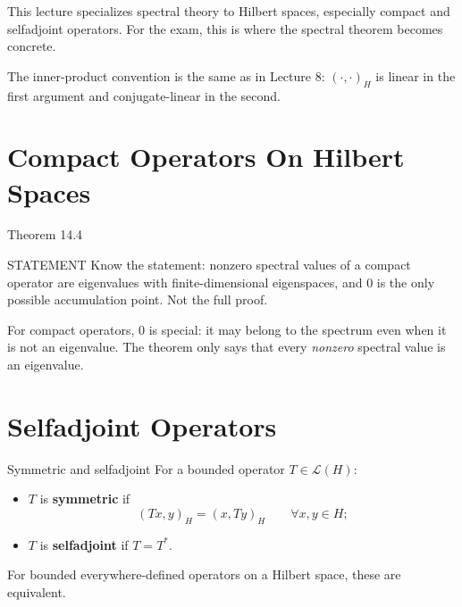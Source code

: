 \documentclass[header={Lecture 11 Exam Study Notes}]{study-note}
\begin{document}

\vspace{0.8em}

\begin{focusbox}
This lecture specializes spectral theory to Hilbert spaces, especially compact and selfadjoint operators. For the exam, this is where the spectral theorem becomes concrete.

\medskip

The inner-product convention is the same as in Lecture 8: $(\cdot,\cdot)_H$ is linear in the first argument and conjugate-linear in the second.
\end{focusbox}

\tableofcontents

\section{Compact Operators On Hilbert Spaces}

\begin{thmbox}{Theorem 14.4}
\thmCompactSpectrum
\end{thmbox}

\begin{prooflevelbox}{STATEMENT}
Know the statement: nonzero spectral values of a compact operator are eigenvalues with finite-dimensional eigenspaces, and $0$ is the only possible accumulation point. Not the full proof.
\end{prooflevelbox}

\begin{focusbox}
For compact operators, $0$ is special: it may belong to the spectrum even when it is not an eigenvalue. The theorem only says that every \emph{nonzero} spectral value is an eigenvalue.
\end{focusbox}

\section{Selfadjoint Operators}

\begin{defbox}{Symmetric and selfadjoint}
For a bounded operator $T\in\mathcal L(H)$:
\begin{itemize}
\item $T$ is \textbf{symmetric} if
\[
(Tx,y)_H=(x,Ty)_H \qquad \forall x,y\in H;
\]
\item $T$ is \textbf{selfadjoint} if $T=T^*$.
\end{itemize}
For bounded everywhere-defined operators on a Hilbert space, these are equivalent.
\end{defbox}
\end{document}
